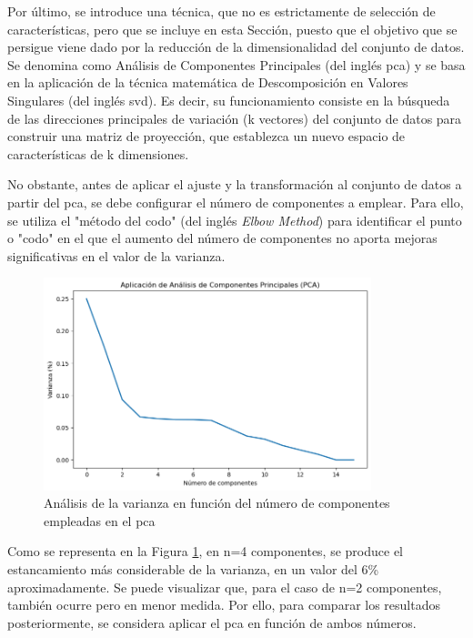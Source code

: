 \vspace{3mm}

Por último, se introduce una técnica, que no es estrictamente de selección de características, pero que se incluye en esta Sección, puesto que el objetivo que se persigue viene dado por la reducción de la dimensionalidad del conjunto de datos. Se denomina como Análisis de Componentes Principales (del inglés \gls{pca}) \cite{pca} y se basa en la aplicación de la técnica matemática de Descomposición en Valores Singulares (del inglés \gls{svd}). Es decir, su funcionamiento consiste en la búsqueda de las direcciones principales de variación (k vectores) del conjunto de datos para construir una matriz de proyección, que establezca un nuevo espacio de características de k dimensiones.

\vspace{3mm}

No obstante, antes de aplicar el ajuste y la transformación al conjunto de datos a partir del \gls{pca}, se debe configurar el número de componentes a emplear. Para ello, se utiliza el "método del codo" (del inglés \textit{Elbow Method}) para identificar el punto o "codo" en el que el aumento del número de componentes no aporta mejoras significativas en el valor de la varianza. 

\vspace{3mm}

\begin{figure}[H]
  \centering
  \includegraphics[width=0.85\textwidth]{img/desarrollo/pca.png}
  \caption{Análisis de la varianza en función del número de componentes empleadas en el \gls{pca}}
  \label{fig:pca}
\end{figure}

\vspace{3mm}

Como se representa en la Figura \ref{fig:pca}, en n=4 componentes, se produce el estancamiento más considerable de la varianza, en un valor del 6\% aproximadamente. Se puede visualizar que, para el caso de n=2 componentes, también ocurre pero en menor medida. Por ello, para comparar los resultados posteriormente, se considera aplicar el \gls{pca} en función de ambos números.

